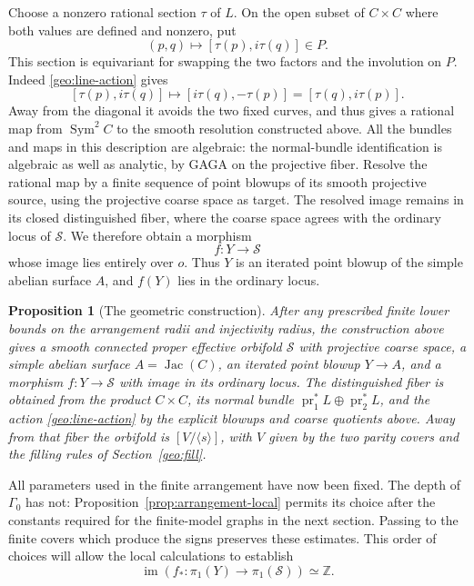 \documentclass[11pt,reqno]{amsart}
\numberwithin{equation}{section}
\newtheorem{proposition}[theorem]{Proposition}
\theoremstyle{definition}
\theoremstyle{remark}
\newcommand{\Z}{\mathbb Z}
\newcommand{\cS}{\mathcal S}
\DeclareMathOperator{\im}{im}
\DeclareMathOperator{\Sym}{Sym}
\DeclareMathOperator{\Jac}{Jac}
\begin{document}
Choose a nonzero rational section $\tau$ of $L$.  On the open subset
of $C\times C$ where both values are defined and nonzero, put
\begin{equation}\label{geo:rational-section}
                 (p,q)\longmapsto[\tau(p),i\tau(q)]\in P.
\end{equation}
This section is equivariant for swapping the two factors and the
involution on $P$.  Indeed \eqref{geo:line-action} gives
\[
       [\tau(p),i\tau(q)]\longmapsto[i\tau(q),-\tau(p)]
                            =[\tau(q),i\tau(p)].
\]
Away from the diagonal it avoids the two fixed curves, and thus gives
a rational map from $\Sym^2C$ to the smooth resolution constructed
above.  All the bundles and maps in this description are algebraic:
the normal-bundle identification is algebraic as well as analytic,
by GAGA on the projective fiber.  Resolve the rational map by a finite
sequence of point blowups of its smooth projective source, using the
projective coarse space as target.  The resolved image remains in its
closed distinguished fiber, where the coarse space agrees with the
ordinary locus of $\cS$.  We therefore obtain a morphism
\begin{equation}\label{geo:Ymap}
                        f:Y\longrightarrow\cS
\end{equation}
whose image lies entirely over $o$.  Thus $Y$ is an iterated point
blowup of the simple abelian surface $A$, and $f(Y)$ lies in the
ordinary locus.

\begin{proposition}[The geometric construction]\label{prop:orbifold-surface}
After any prescribed finite lower bounds on the arrangement radii and
injectivity radius, the construction above gives a smooth connected
proper effective orbifold $\cS$ with projective coarse space, a simple
abelian surface $A=\Jac(C)$, an iterated point blowup $Y\to A$, and a
morphism $f:Y\to\cS$ with image in its ordinary locus.  The distinguished
fiber is obtained from the product $C\times C$, its normal bundle
$\operatorname{pr}_1^*L\oplus\operatorname{pr}_2^*L$, and the action
\eqref{geo:line-action} by the explicit blowups and coarse quotients
above.  Away from that fiber the orbifold is $[V/\langle s\rangle]$,
with $V$ given by the two parity covers and the filling rules of
Section~\ref{geo:fill}.
\end{proposition}

All parameters used in the finite arrangement have now been fixed.
The depth of $\Gamma_0$ has not: Proposition~\ref{prop:arrangement-local}
permits its choice after the constants required for the finite-model
graphs in the next section.  Passing to the finite covers which produce
the signs preserves these estimates.  This order of choices will
allow the local calculations to establish
\[
                    \im(f_*:\pi_1(Y)\to\pi_1(\cS))\simeq\Z.
\]
\end{document}
